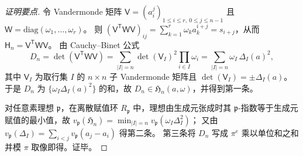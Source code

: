 \begin{proof}[证明要点]
令 Vandermonde 矩阵 \(\mathsf V=(a_i^j)_{1\le i\le r,\ 0\le j\le n-1}\) 且 \(\mathsf W=\mathrm{diag}(\omega_1,\dots,\omega_r)\)。
则
\(
(\mathsf V^{\mathsf T}\mathsf W\mathsf V)_{ij}=\sum_{k=1}^r\omega_k a_k^{i+j}=s_{i+j}
\)，从而 \(\mathsf H_n=\mathsf V^{\mathsf T}\mathsf W\mathsf V\)。
由 Cauchy--Binet 公式
\[
D_n=\det(\mathsf V^{\mathsf T}\mathsf W\mathsf V)
=\sum_{|I|=n}\det(\mathsf V_I)^2\prod_{i\in I}\omega_i
=\sum_{|I|=n}\omega_I\,\Delta_I(a)^2,
\]
其中 \(\mathsf V_I\) 为取行集 \(I\) 的 \(n\times n\) 子 Vandermonde 矩阵且 \(\det(\mathsf V_I)=\pm\Delta_I(a)\)。
于是 \(D_n\) 为 \(\{\omega_I\Delta_I(a)^2\}\) 的和，故 \(D_n\in\mathfrak H_n(a,\omega)\)，并得到第一条。
\par
对任意素理想 \(\mathfrak p\)，在离散赋值环 \(R_{\mathfrak p}\) 中，理想由生成元张成时其 \(\mathfrak p\)-指数等于生成元赋值的最小值，故
\(
v_{\mathfrak p}(\mathfrak H_n)=\min_{|I|=n}v_{\mathfrak p}(\omega_I\Delta_I^2)
\)；
又由 \(v_{\mathfrak p}(\Delta_I)=\sum_{i<j}v_{\mathfrak p}(a_j-a_i)\) 得第二条。
第三条将 \(D_n\) 写成 \(\pi^e\) 乘以单位和之和并模 \(\pi\) 取像即得。证毕。
\end{proof}

